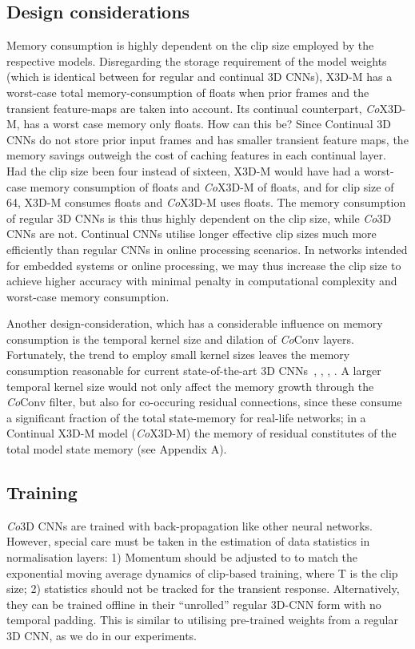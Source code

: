 \documentclass[runningheads]{llncs}
\begin{document}
\subsection{Design considerations} \label{sec:design-considerations}
\vspace{-1mm}
Memory consumption is highly dependent on the clip size employed by the respective models. 
Disregarding the storage requirement of the model weights (which is identical between for regular and continual 3D CNNs), X3D-M has a worst-case total memory-consumption of  floats when prior frames and the transient feature-maps are taken into account.
Its continual counterpart, \textit{Co}X3D-M, has a worst case memory only  floats. 
How can this be? 
Since Continual 3D CNNs do not store prior input frames and has smaller transient feature maps, the memory savings outweigh the cost of caching features in each continual layer.
Had the clip size been four instead of sixteen, X3D-M would have had a worst-case memory consumption of  floats and \textit{Co}X3D-M of  floats, and for clip size of 64, X3D-M consumes  floats and \textit{Co}X3D-M uses  floats.
The memory consumption of regular 3D CNNs is this thus highly dependent on the clip size, while \textit{Co}3D CNNs are not.
Continual CNNs utilise longer effective clip sizes much more efficiently than regular CNNs in online processing scenarios. 
In networks intended for embedded systems or online processing, we may thus increase the clip size to achieve higher accuracy with minimal penalty in computational complexity and worst-case memory consumption.

Another design-consideration, which has a considerable influence on memory consumption is the temporal kernel size and dilation of \textit{Co}Conv layers.
Fortunately, the trend to employ small kernel sizes leaves the memory consumption reasonable for current state-of-the-art 3D CNNs~\cite{carreira2017quo}, \cite{tran2018closer}, \cite{feichtenhofer2019slowfast}, \cite{feichtenhofer2020x3d}. A larger temporal kernel size would not only affect the memory growth through the \textit{Co}Conv filter, but also for co-occuring residual connections, since these  consume a significant fraction of the total state-memory for real-life networks; in a Continual X3D-M model (\textit{Co}X3D-M) the memory of residual constitutes  of the total model state memory (see Appendix A).

\vspace{-2mm}
\subsection{Training}
\textit{Co}3D CNNs are trained with back-propagation like other neural networks. However, special care must be taken in the estimation of data statistics in normalisation layers: 1) Momentum should be adjusted to  to match the exponential moving average dynamics of clip-based training, where T is the clip size; 2) statistics should not be tracked for the transient response.
Alternatively, they can be trained offline in their ``unrolled'' regular 3D-CNN form with no temporal padding. This is similar to utilising pre-trained weights from a regular 3D CNN, as we do in our experiments.
\end{document}

